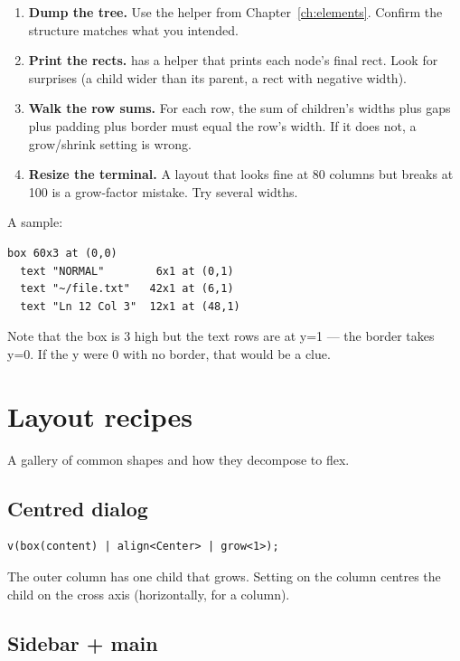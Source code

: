 \begin{enumerate}[leftmargin=*]
  \item \textbf{Dump the tree.} Use the  helper from
    Chapter~\ref{ch:elements}. Confirm the structure matches
    what you intended.
  \item \textbf{Print the rects.} \maya{} has a
     helper that prints each node's
    final rect. Look for surprises (a child wider than its
    parent, a rect with negative width).
  \item \textbf{Walk the row sums.} For each row, the sum of
    children's widths plus gaps plus padding plus border must
    equal the row's width. If it does not, a grow/shrink
    setting is wrong.
  \item \textbf{Resize the terminal.} A layout that looks fine
    at 80 columns but breaks at 100 is a grow-factor mistake.
    Try several widths.
\end{enumerate}

A  sample:

\begin{lstlisting}
box 60x3 at (0,0)
  text "NORMAL"        6x1 at (0,1)
  text "~/file.txt"   42x1 at (6,1)
  text "Ln 12 Col 3"  12x1 at (48,1)
\end{lstlisting}

Note that the box is 3 high but the text rows are at y=1 ---
the border takes y=0. If the y were 0 with no border, that would
be a clue.

\section{Layout recipes}

A gallery of common shapes and how they decompose to flex.

\subsection*{Centred dialog}

\begin{lstlisting}
v(box(content) | align<Center> | grow<1>);
\end{lstlisting}

The outer column has one child that grows. Setting
 on the column centres the child on the
cross axis (horizontally, for a column).

\subsection*{Sidebar + main}

